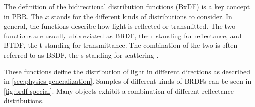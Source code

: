 The definition of the bidirectional distribution functions (\gls{BxDF}) is a key concept in PBR. The $x$ stands for the different kinds of distributions to consider. In general, the functions describe how light is reflected or transmitted. The two functions are usually abbreviated as \gls{BRDF}, the r standing for reflectance, and \gls{BTDF}, the t standing for transmittance. The combination of the two is often referred to as \gls{BSDF}, the s standing for scattering \cite{Pharr_Physically_Based_Rendering_2023}.

These functions define the distribution of light in different directions as described in \autoref{sec:physics-generalization}. Samples of different kinds of \glspl{BRDF} can be seen in \autoref{fig:brdf-special}. Many objects exhibit a combination of different reflectance distributions.

